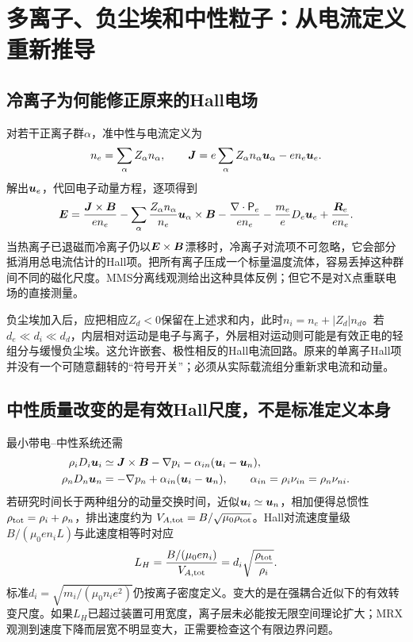 \documentclass[UTF8,a4paper,11pt,openany,fontset=fandol]{ctexbook}
\begin{document}
\section{多离子、负尘埃和中性粒子：从电流定义重新推导}
\label{sec:remaining-multispecies}
\subsection{冷离子为何能修正原来的Hall电场}
对若干正离子群$\alpha$，准中性与电流定义为
\begin{equation}
 n_e=\sum_\alpha Z_\alpha n_\alpha,\qquad
 \bm{J}=e\sum_\alpha Z_\alpha n_\alpha\bm{u}_\alpha-en_e\bm{u}_e.
\end{equation}
解出$\bm{u}_e$，代回电子动量方程，逐项得到
\begin{equation}
 \bm{E}={\bm{J}\times\bm{B}\over en_e}
 -\sum_\alpha{Z_\alpha n_\alpha\over n_e}\bm{u}_\alpha\times\bm{B}
 -{\nabla\cdot\mathsf P_e\over en_e}-{m_e\over e}D_e\bm{u}_e
 +{\bm{R}_e\over en_e}.
\end{equation}
当热离子已退磁而冷离子仍以$\bm{E}\times\bm{B}$漂移时，冷离子对流项不可忽略，它会部分抵消用总电流估计的Hall项。把所有离子压成一个标量温度流体，容易丢掉这种群间不同的磁化尺度。MMS分离线观测给出这种具体反例\citep{L227}；但它不是对X点重联电场的直接测量。

负尘埃加入后，应把相应$Z_d<0$保留在上述求和内，此时$n_i=n_e+|Z_d|n_d$。若$d_e\ll d_i\ll d_d$，内层相对运动是电子与离子，外层相对运动则可能是有效正电的轻组分与缓慢负尘埃。这允许嵌套、极性相反的Hall电流回路\citep{L283}。原来的单离子Hall项并没有一个可随意翻转的“符号开关”；必须从实际载流组分重新求电流和动量。

\subsection{中性质量改变的是有效Hall尺度，不是标准定义本身}
最小带电--中性系统还需
\begin{align}
 \rho_iD_i\bm{u}_i&\simeq\bm{J}\times\bm{B}-\nabla p_i-\alpha_{in}(\bm{u}_i-\bm{u}_n),\\
 \rho_nD_n\bm{u}_n&=-\nabla p_n+\alpha_{in}(\bm{u}_i-\bm{u}_n),
 \qquad\alpha_{in}=\rho_i\nu_{in}=\rho_n\nu_{ni}.
\end{align}
若研究时间长于两种组分的动量交换时间，近似$\bm{u}_i\simeq\bm{u}_n$，相加便得总惯性$\rho_{\rm tot}=\rho_i+\rho_n$，排出速度约为
$V_{A,\rm tot}=B/\sqrt{\mu_0\rho_{\rm tot}}$。Hall对流速度量级$B/(\mu_0en_iL)$与此速度相等时对应
\begin{equation}
 L_H={B/(\mu_0en_i)\over V_{A,\rm tot}}
 =d_i\sqrt{\rho_{\rm tot}\over\rho_i}.
\end{equation}
标准$d_i=\sqrt{m_i/(\mu_0n_ie^2)}$仍按离子密度定义。变大的是在强耦合近似下的有效转变尺度。如果$L_H$已超过装置可用宽度，离子层未必能按无限空间理论扩大；MRX观测到速度下降而层宽不明显变大，正需要检查这个有限边界问题\citep{L190}。
\end{document}

